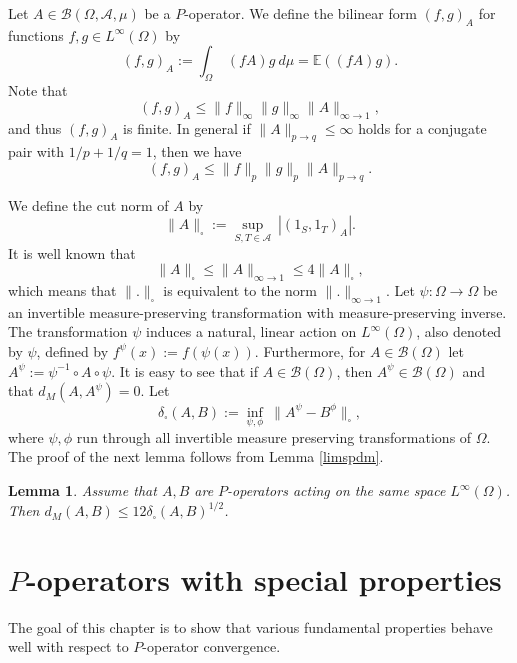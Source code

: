 \documentclass[a4wider]{amsart}
\newtheorem{lemma}[theorem]{Lemma}
\theoremstyle{definitionbreak}\newtheorem{D}[theorem]{Definition}
\theoremstyle{definitionbreak}\newtheorem*{D*}{Definition}
\begin{document}
Let $A\in\mathcal{B}(\Omega,\mathcal{A},\mu)$ be a $P$-operator. We define the bilinear form  $(f,g)_A$ for functions $f,g\in L^\infty(\Omega)$ by
\begin{equation}\label{skaleq}
(f,g)_A:=\int_{\Omega}~ (fA)g~d\mu = \mathbb{E}((fA)g).
\end{equation}
 Note that $$(f,g)_A\leq \|f\|_\infty\|g\|_\infty\|A\|_{\infty\to 1},$$ and thus $(f,g)_A$ is finite. In general if $\|A\|_{p\to q}\leq\infty$ holds for a conjugate pair with $1/p+1/q=1$, then we have 
\begin{equation}\label{skalineq}
 (f,g)_A\leq\|f\|_p\|g\|_p\|A\|_{p\to q}.
\end{equation}
 
 
 We define the cut norm of $A$ by 
$$\|A\|_\square:=\sup_{S,T\in\mathcal{A}} ~ |(1_S,1_T)_A|.$$
It is well known that 
$$\|A\|_\square\leq \|A\|_{\infty\to 1}\leq 4\|A\|_\square,$$ which means that $\|.\|_\square$ is equivalent to the norm $\|.\|_{\infty\to 1}$.
Let $\psi:\Omega\to\Omega$ be an invertible measure-preserving transformation with measure-preserving inverse. The transformation $\psi$ induces a natural, linear action on $L^\infty(\Omega)$, also denoted by $\psi$, defined by $f^\psi(x):=f(\psi(x))$. Furthermore, for $A\in\mathcal{B}(\Omega)$ let $A^\psi:=\psi^{-1}\circ A\circ\psi$. It is easy to see that if $A\in\mathcal{B}(\Omega)$, then $A^\psi\in\mathcal{B}(\Omega)$ and that $d_M(A,A^\psi)=0$. Let
$$\delta_\square(A,B):=\inf_{\psi,\phi}~\|A^\psi-B^\phi\|_\square,$$ where $\psi,\phi$ run through all invertible measure preserving transformations of $\Omega$. The proof of the next lemma follows from Lemma \ref{limspdm}.



\begin{lemma}\label{limspdm2} Assume that $A,B$ are $P$-operators acting on the same space $L^\infty(\Omega)$. Then $d_M(A,B)\leq 12\delta_\square(A,B)^{1/2}$.
\end{lemma}

\section{$P$-operators with special properties}

The goal of this chapter is to show that various fundamental properties behave well with respect to $P$-operator convergence. 
\end{document}
